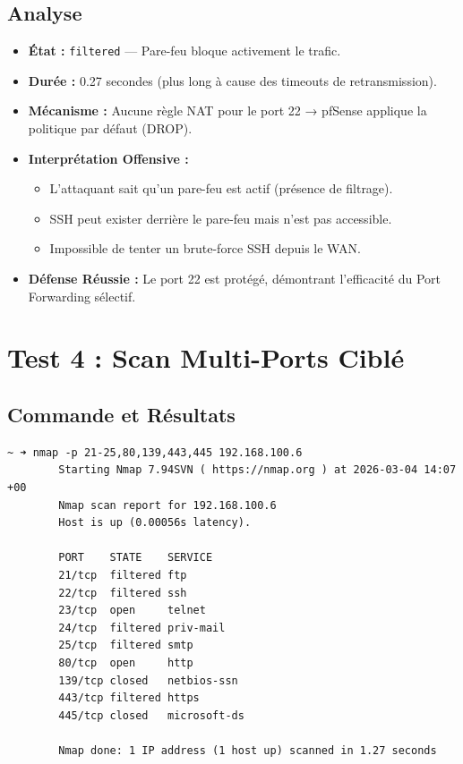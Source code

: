 \documentclass[12pt,a4paper,openany]{report}
\begin{document}
	\subsection{Analyse}
	\begin{itemize}
		\item \textbf{État :} \texttt{filtered} --- Pare-feu bloque activement le trafic.
		\item \textbf{Durée :} 0.27 secondes (plus long à cause des timeouts de retransmission).
		\item \textbf{Mécanisme :} Aucune règle NAT pour le port 22 → pfSense applique la politique par défaut (DROP).
		\item \textbf{Interprétation Offensive :}
		\begin{itemize}
			\item L'attaquant sait qu'un pare-feu est actif (présence de filtrage).
			\item SSH peut exister derrière le pare-feu mais n'est pas accessible.
			\item Impossible de tenter un brute-force SSH depuis le WAN.
		\end{itemize}
		\item \textbf{Défense Réussie :} Le port 22 est protégé, démontrant l'efficacité du Port Forwarding sélectif.
	\end{itemize}
	
	\section{Test 4 : Scan Multi-Ports Ciblé}
	\subsection{Commande et Résultats}
	\begin{lstlisting}[caption=Scan Nmap de ports multiples]
		~ ➜ nmap -p 21-25,80,139,443,445 192.168.100.6
		Starting Nmap 7.94SVN ( https://nmap.org ) at 2026-03-04 14:07 +00
		Nmap scan report for 192.168.100.6
		Host is up (0.00056s latency).
		
		PORT    STATE    SERVICE
		21/tcp  filtered ftp
		22/tcp  filtered ssh
		23/tcp  open     telnet
		24/tcp  filtered priv-mail
		25/tcp  filtered smtp
		80/tcp  open     http
		139/tcp closed   netbios-ssn
		443/tcp filtered https
		445/tcp closed   microsoft-ds
		
		Nmap done: 1 IP address (1 host up) scanned in 1.27 seconds
	\end{lstlisting}
	
\end{document}

